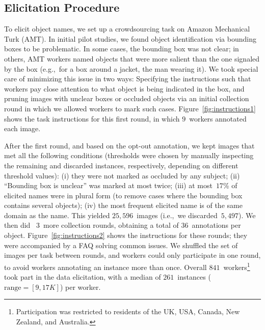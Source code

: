 \subsection{Elicitation Procedure}
\label{ssec:elicitation}

To elicit object names, we set up a crowdsourcing task on Amazon Mechanical Turk (AMT).
In initial pilot studies, we found object identification via bounding boxes to be problematic.
In some cases, the bounding box was not clear; in others, AMT workers named objects that were more salient than the one signaled by the box (e.g.,~for a box around a jacket, the man wearing it).
We took special care of minimizing this issue in two ways: Specifying the instructions such that workers pay close attention to what object is being indicated in the box, and pruning images with unclear boxes or occluded objects via an initial collection round in which we allowed workers to mark such cases.
Figure~\ref{fig:instructions1} shows the task instructions for this first round, in which $9$~workers annotated each image.

After the first round, and based on the opt-out annotation, we kept images that met all the following conditions (thresholds were chosen by manually inspecting the remaining and discarded instances, respectively, depending on different threshold values): (i) they were not marked as occluded by any subject; (ii) ``Bounding box is unclear'' was marked at most twice; (iii) at most~$17$\% of elicited names were in plural form (to remove cases where the bounding box contains several objects); (iv) the most frequent elicited name is of the same domain as the \vg name.
This yielded $25,596$~images (i.e.,~we discarded~$5,497$).
We then did ~3~more collection rounds, obtaining a total of $36$~annotations per object.
Figure~\ref{fig:instructions2} shows the instructions for these rounds; they were accompanied by a FAQ solving common issues. 
We shuffled the set of images per task between rounds, and workers could only participate in one round, to avoid workers annotating an instance more than once.
Overall $841$~workers\footnote{Participation was restricted to residents of the UK, USA, Canada, New Zealand, and Australia.} took part in the data elicitation, with a median of  $261$~instances \mbox{($\textrm{range}=[9,17K]$)} per worker.

